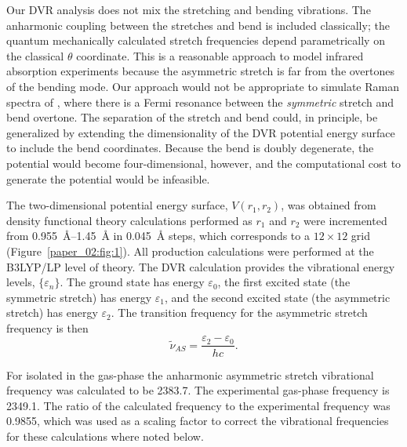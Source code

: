 \documentclass[%
  class = book,%
  crop = false,%
  float = true,%
  multi = true,%
  preview = false,%
]{standalone}
\begin{document}
Our DVR analysis does not mix the stretching and bending vibrations. The anharmonic coupling between the stretches and bend is included classically; the quantum mechanically calculated stretch frequencies depend parametrically on the classical \(\theta\) coordinate. This is a reasonable approach to model infrared absorption experiments because the asymmetric stretch is far from the overtones of the bending mode. Our approach would not be appropriate to simulate Raman spectra of , where there is a Fermi resonance between the \emph{symmetric} stretch and bend overtone. The separation of the stretch and bend could, in principle, be generalized by extending the dimensionality of the DVR potential energy surface to include the bend coordinates. Because the bend is doubly degenerate, the potential would become four-dimensional, however, and the computational cost to generate the potential would be infeasible.

The two-dimensional potential energy surface, \(V\left(r_1,r_2\right)\), was obtained from density functional theory calculations performed as \(r_1\) and \(r_2\) were incremented from \SIrange{0.955}{1.45}{\angstrom} in \SI{0.045}{\angstrom} steps, which corresponds to a \(12 \times 12\) grid (Figure~\ref{paper_02:fig:1}). All production calculations were performed at the B3LYP/LP level of theory. The DVR calculation provides the vibrational energy levels, \(\{\varepsilon_{n}\}\). The ground state has energy \(\varepsilon_{0}\), the first excited state (the symmetric stretch) has energy \(\varepsilon_{1}\), and the second excited state (the asymmetric stretch) has energy \(\varepsilon_{2}\). The transition frequency for the asymmetric stretch frequency is then
\begin{equation}
  \label{paper_02:eq:2}
  \widetilde{\nu}_{AS} = \frac{\varepsilon_{2} - \varepsilon_{0}}{hc}.
\end{equation}

For  isolated in the gas-phase the anharmonic asymmetric stretch vibrational frequency was calculated to be \SI{2383.7}{\wavenumber}. The experimental gas-phase frequency is \SI{2349.1}{\wavenumber}. The ratio of the calculated frequency to the experimental frequency was \num{0.9855}, which was used as a scaling factor to correct the vibrational frequencies for these calculations where noted below.
\end{document}
